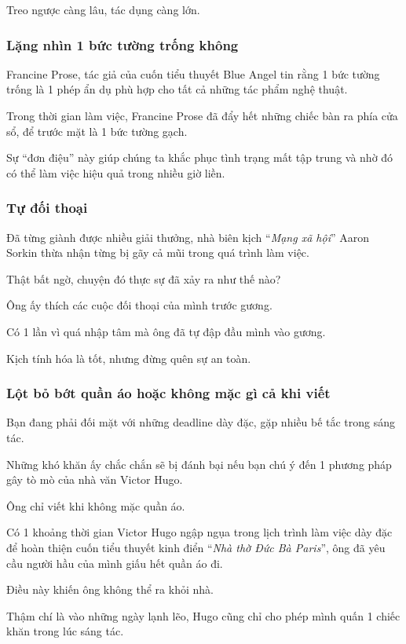 \documentclass{article}
\begin{document}
Treo ngược càng lâu, tác dụng càng lớn.

\subsubsection{Lặng nhìn 1 bức tường trống không}
Francine Prose, tác giả của cuốn tiểu thuyết Blue Angel tin rằng 1 bức tường trống là 1 phép ẩn dụ phù hợp cho tất cả những tác phẩm nghệ thuật.

Trong thời gian làm việc, Francine Prose đã đẩy hết những chiếc bàn ra phía cửa sổ, để trước mặt là 1 bức tường gạch.

Sự ``đơn điệu''  này giúp chúng ta khắc phục tình trạng mất tập trung và nhờ đó có thể làm việc hiệu quả trong nhiều giờ liền.

\subsubsection{Tự đối thoại}
Đã từng giành được nhiều giải thưởng, nhà biên kịch ``\textit{Mạng xã hội}'' Aaron Sorkin thừa nhận từng bị gãy cả mũi trong quá trình làm việc.

Thật bất ngờ, chuyện đó thực sự đã xảy ra như thế nào?

Ông ấy thích các cuộc đối thoại của mình trước gương.

Có 1 lần vì quá nhập tâm mà ông đã tự đập đầu mình vào gương.

Kịch tính hóa là tốt, nhưng đừng quên sự an toàn.

\subsubsection{Lột bỏ bớt quần áo hoặc không mặc gì cả khi viết}
Bạn đang phải đối mặt với những deadline dày đặc, gặp nhiều bế tắc trong sáng tác.

Những khó khăn ấy chắc chắn sẽ bị đánh bại nếu bạn chú ý đến 1 phương pháp gây tò mò của nhà văn Victor Hugo.

Ông chỉ viết khi không mặc quần áo.

Có 1 khoảng thời gian Victor Hugo ngập ngụa trong lịch trình làm việc dày đặc để hoàn thiện cuốn tiểu thuyết kinh điển ``\textit{Nhà thờ Đức Bà Paris}'', ông đã yêu cầu người hầu của mình giấu hết quần áo đi.

Điều này khiến ông không thể ra khỏi nhà.

Thậm chí là vào những ngày lạnh lẽo, Hugo cũng chỉ cho phép mình quấn 1 chiếc khăn trong lúc sáng tác.
\end{document}
